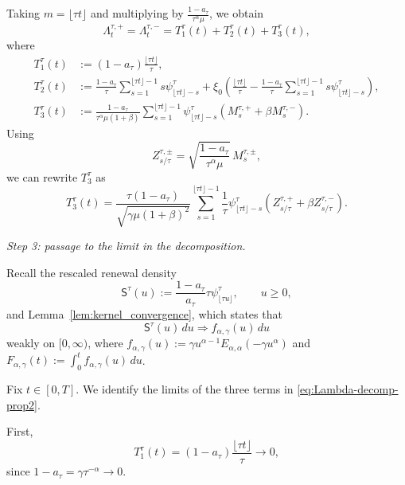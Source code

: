 \documentclass[letterpaper]{article}
\numberwithin{equation}{section}
\theoremstyle{definition}
\theoremstyle{remark}
\begin{document}
Taking $m=\lfloor \tau t\rfloor$ and multiplying by
$\frac{1-a_\tau}{\tau^\alpha\mu}$, we obtain
\begin{equation}\label{eq:Lambda-decomp-prop2}
  \Lambda_t^{\tau,+}=\Lambda_t^{\tau,-}=T_1^\tau(t)+T_2^\tau(t)+T_3^\tau(t),
\end{equation}
where
\begin{align*}
  T_1^\tau(t)
  &:=
  (1-a_\tau)\frac{\lfloor \tau t\rfloor}{\tau},
  \\
  T_2^\tau(t)
  &:=
  \frac{1-a_\tau}{\tau}
  \sum_{s=1}^{\lfloor \tau t\rfloor-1}s\psi_{\lfloor \tau t\rfloor-s}^\tau
  +
  \xi_0
  \left(
    \frac{\lfloor \tau t\rfloor}{\tau}
    -
    \frac{1-a_\tau}{\tau}
    \sum_{s=1}^{\lfloor \tau t\rfloor-1}s\psi_{\lfloor \tau t\rfloor-s}^\tau
  \right),
  \\
  T_3^\tau(t)
  &:=
  \frac{1-a_\tau}{\tau^\alpha\mu(1+\beta)}
  \sum_{s=1}^{\lfloor \tau t\rfloor-1}
  \psi_{\lfloor \tau t\rfloor-s}^\tau
  \left(
    M_s^{\tau,+}+\beta M_s^{\tau,-}
  \right).
\end{align*}
Using
\[
  Z_{s/\tau}^{\tau,\pm}
  =
  \sqrt{\frac{1-a_\tau}{\tau^\alpha\mu}}\,M_s^{\tau,\pm},
\]
we can rewrite $T_3^\tau$ as
\begin{equation}\label{eq:T3-rewrite-prop2}
  T_3^\tau(t)
  =
  \frac{\tau(1-a_\tau)}{\sqrt{\gamma\mu(1+\beta)^2}}
  \sum_{s=1}^{\lfloor \tau t\rfloor-1}
  \frac1{\tau}\psi_{\lfloor \tau t\rfloor-s}^\tau
  \left(
    Z_{s/\tau}^{\tau,+}+\beta Z_{s/\tau}^{\tau,-}
  \right).
\end{equation}

\medskip
\noindent
\textit{Step 3: passage to the limit in the decomposition.}

Recall the rescaled renewal density
\[
  \mathsf S^\tau(u):=
  \frac{1-a_\tau}{a_\tau}\tau\psi_{\lfloor \tau u\rfloor}^\tau,
  \qquad u\ge0,
\]
and Lemma~\ref{lem:kernel_convergence}, which states that
\[
  \mathsf S^\tau(u)\,du \Rightarrow f_{\alpha,\gamma}(u)\,du
\]
weakly on $[0,\infty)$, where
$f_{\alpha,\gamma}(u):=\gamma u^{\alpha-1}E_{\alpha,\alpha}(-\gamma u^\alpha)$
and 
$F_{\alpha,\gamma}(t):=\int_0^t f_{\alpha,\gamma}(u)\,du$.

Fix $t\in[0,T]$. We identify the limits of the three terms in
\eqref{eq:Lambda-decomp-prop2}.

First,
\[
  T_1^\tau(t)=(1-a_\tau)\frac{\lfloor \tau t\rfloor}{\tau}\to0,
\]
since $1-a_\tau=\gamma\tau^{-\alpha}\to0$.
\end{document}
